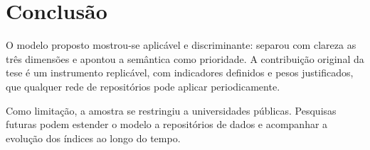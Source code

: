 \chapter{Conclusão}
\label{cap:conclusao}


O modelo proposto mostrou-se aplicável e discriminante: separou com clareza as três dimensões e apontou a semântica como prioridade. A contribuição original da tese é um instrumento replicável, com indicadores definidos e pesos justificados, que qualquer rede de repositórios pode aplicar periodicamente.

Como limitação, a amostra se restringiu a universidades públicas. Pesquisas futuras podem estender o modelo a repositórios de dados e acompanhar a evolução dos índices ao longo do tempo.
